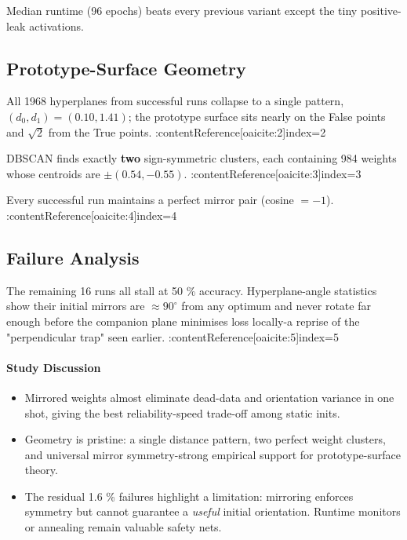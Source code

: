Median runtime (96 epochs) beats every previous variant except the tiny
positive-leak activations.

\subsection*{Prototype-Surface Geometry}

\begin{description}[leftmargin=2em]
  \item[Distance clusters]  
        All 1968 hyperplanes from successful runs collapse to a single
        pattern, \((d_{0},d_{1})=(0.10,1.41)\); the prototype surface
        sits nearly on the False points and \(\sqrt2\) from the True
        points. :contentReference[oaicite:2]{index=2}
  \item[Weight clusters]  
        DBSCAN finds exactly \textbf{two} sign-symmetric clusters, each
        containing 984 weights whose centroids are \(\pm(0.54,-0.55)\). :contentReference[oaicite:3]{index=3}
  \item[Mirror symmetry]  
        Every successful run maintains a perfect mirror pair (cosine
        \(=-1\)). :contentReference[oaicite:4]{index=4}
\end{description}

\subsection*{Failure Analysis}
The remaining 16 runs all stall at 50 \% accuracy.  Hyperplane-angle
statistics show their initial mirrors are
\(\approx\!90^{\circ}\) from any optimum and never rotate far enough
before the companion plane minimises loss locally-a reprise of the
"perpendicular trap" seen earlier. :contentReference[oaicite:5]{index=5}

\paragraph{Study Discussion}
\begin{itemize}
  \item Mirrored weights almost eliminate dead-data and orientation
        variance in one shot, giving the best reliability-speed trade-off
        among static inits.
  \item Geometry is pristine: a single distance pattern, two perfect
        weight clusters, and universal mirror symmetry-strong empirical
        support for prototype-surface theory.
  \item The residual 1.6 \% failures highlight a limitation: mirroring
        enforces symmetry but cannot guarantee a \emph{useful} initial
        orientation.  Runtime monitors or annealing remain valuable
        safety nets.
\end{itemize}

\hrulefill
